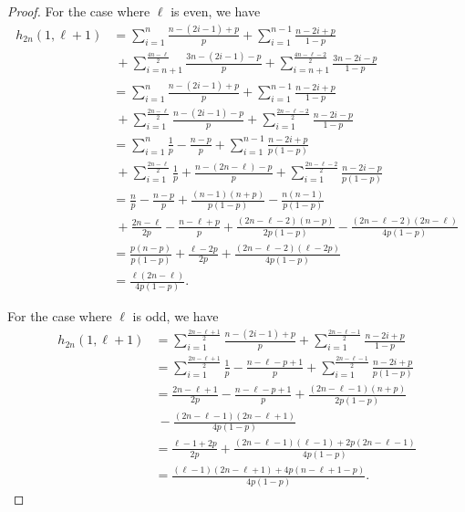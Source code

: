 \documentclass[12pt, leqno]{amsart}
\numberwithin{equation}{section}
\theoremstyle{plain}
\theoremstyle{definition}
\newcommand{\0}{\mathbf{0}}
\begin{document}
\begin{proof}
For the case where $\ell$ is even, we have
\begin{align*}
h_{2n}(1,\ell+1)&=\sum_{i=1}^n\frac{n-(2i-1)+p}{p}+\sum_{i=1}^{n-1}\frac{n-2i+p}{1-p}\\
&~+\sum_{i=n+1}^{\frac{4n-\ell}{2}}\frac{3n-(2i-1)-p}{p}+\sum_{i=n+1}^{\frac{4n-\ell-2}{2}}\frac{3n-2i-p}{1-p}\\
&=\sum_{i=1}^n\frac{n-(2i-1)+p}{p}+\sum_{i=1}^{n-1}\frac{n-2i+p}{1-p}\\
&~+\sum_{i=1}^{\frac{2n-\ell}{2}}\frac{n-(2i-1)-p}{p}+\sum_{i=1}^{\frac{2n-\ell-2}{2}}\frac{n-2i-p}{1-p} \\
&=\sum_{i=1}^n\frac{1}{p}-\frac{n-p}{p}+\sum_{i=1}^{n-1}\frac{n-2i+p}{p(1-p)}\\
&~+\sum_{i=1}^{\frac{2n-\ell}{2}}\frac{1}{p}+\frac{n-(2n-\ell)-p}{p}+\sum_{i=1}^{\frac{2n-\ell-2}{2}}\frac{n-2i-p}{p(1-p)}\\
&=\frac{n}{p}-\frac{n-p}{p}+\frac{(n-1)(n+p)}{p(1-p)}-\frac{n(n-1)}{p(1-p)}\\
&~+\frac{2n-\ell}{2p}-\frac{n-\ell+p}{p}+\frac{(2n-\ell-2)(n-p)}{2p(1-p)}-\frac{(2n-\ell-2)(2n-\ell)}{4p(1-p)}\\
&=\frac{p(n-p)}{p(1-p)}+\frac{\ell-2p}{2p}+\frac{(2n-\ell-2)(\ell-2p)}{4p(1-p)}\\
&=\frac{\ell(2n-\ell)}{4p(1-p)}.
\end{align*}

For the case where $\ell$ is odd, we have
\begin{align*}
h_{2n}(1,\ell+1)%
&=\sum_{i=1}^{\frac{2n-\ell+1}{2}}\frac{n-(2i-1)+p}{p}+\sum_{i=1}^{\frac{2n-\ell-1}{2}}\frac{n-2i+p}{1-p}\\
&=\sum_{i=1}^{\frac{2n-\ell+1}{2}}\frac{1}{p}-\frac{n-\ell-p+1}{p}+\sum_{i=1}^{\frac{2n-\ell-1}{2}}\frac{n-2i+p}{p(1-p)}\\
&=\frac{2n-\ell+1}{2p}-\frac{n-\ell-p+1}{p}+\frac{(2n-\ell-1)(n+p)}{2p(1-p)}\\
&~-\frac{(2n-\ell-1)(2n-\ell+1)}{4p(1-p)}\\
&=\frac{\ell-1+2p}{2p}+\frac{(2n-\ell-1)(\ell-1)+2p(2n-\ell-1)}{4p(1-p)}\\
&=\frac{(\ell-1)(2n-\ell+1)+4p(n-\ell+1-p)}{4p(1-p)}.
\end{align*}
\end{proof}
\end{document}
